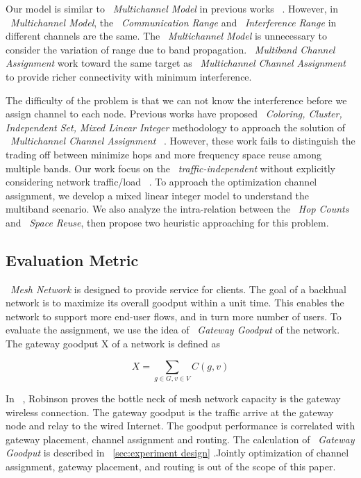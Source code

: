Our model is similar to ~\emph{Multichannel Model} in previous works ~\cite{tang2005interference,yuan2006cross,si2010overview}. However, in ~\emph{Multichannel Model}, the ~\emph{Communication Range} and ~\emph{Interference Range} in different channels are the same. The ~\emph{Multichannel Model} is unnecessary to consider the variation of range due to band propagation.
~\emph{Multiband Channel Assignment} work toward the same target as ~\emph{Multichannel Channel Assignment} to provide richer connectivity with minimum interference.

The difficulty of the problem is that we can not know the interference before we assign channel to each node. Previous works have proposed ~\emph{Coloring, Cluster, Independent Set, Mixed Linear Integer} methodology to approach the solution of ~\emph{Multichannel Channel Assignment} ~\cite{mishra2005weighted,peng2012efficient,tang2005interference}. 
However, these work fails to distinguish the trading off between minimize hops and more frequency space reuse among multiple bands.
Our work focus on the ~\emph{traffic-independent} 
without explicitly considering network traffic/load ~\cite{marina2010topology}.
To approach the optimization channel assignment, we develop a mixed linear integer model to understand the multiband scenario. We also analyze the intra-relation between the ~\emph{Hop Counts} and ~\emph{Space Reuse}, then propose two heuristic approaching for this problem.

\subsection{Evaluation Metric}
\label{subsec:metric}
~\emph{Mesh Network} is designed to provide service for clients. The goal of a backhual network is to maximize its overall goodput within a unit time. 
This enables the network to support more end-user flows, and in turn more number of users. To evaluate the assignment, we use the idea of ~\emph{Gateway Goodput} of the network. The gateway goodput X of a network is defined as

\begin{equation}
\label{eq:goodput}
X=\sum_{g \in G, v \in V}C(g,v)
\end{equation}

In ~\cite{robinson2008adding}, Robinson proves the bottle neck of mesh network capacity is the gateway wireless connection. 
The gateway goodput is the traffic arrive at the gateway node and relay to the wired Internet. The goodput performance is correlated with gateway placement, channel assignment and routing. 
The calculation of ~\emph{Gateway Goodput} is described in ~\ref{sec:experiment design} .Jointly optimization of channel assignment, gateway placement, and routing is out of the scope of this paper.

